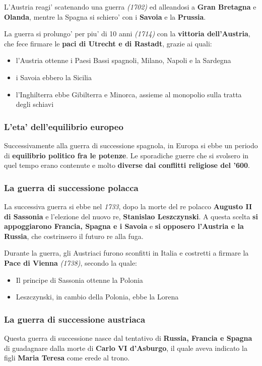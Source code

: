 \documentclass{article}
\begin{document}
{{    L'Austria reagi' scatenando una guerra \textit{(1702)} ed alleandosi a \textbf{Gran Bretagna} e \textbf{Olanda}, mentre la Spagna si schiero' con i \textbf{Savoia} e la \textbf{Prussia}.

    La guerra si prolungo' per piu' di 10 anni \textit{(1714)} con la \textbf{vittoria dell'Austria}, che fece firmare le \textbf{paci di Utrecht e di Rastadt}, grazie ai quali:

    \begin{itemize}
      \item l'Austria ottenne i Paesi Bassi spagnoli, Milano, Napoli e la Sardegna
      \item i Savoia ebbero la Sicilia
      \item l'Inghilterra ebbe Gibilterra e Minorca, assieme al monopolio sulla tratta degli schiavi
    \end{itemize}

    \subsubsection{L'eta' dell'equilibrio europeo}
    Successivamente alla guerra di successione spagnola, in Europa si ebbe un periodo di \textbf{equilibrio politico fra le potenze}. Le sporadiche guerre che si svolsero in quel tempo erano contenute e molto \textbf{diverse dai conflitti religiose del '600}.

    \subsubsection{La guerra di successione polacca}
    La successiva guerra si ebbe nel \textit{1733}, dopo la morte del re polacco \textbf{Augusto II di Sassonia} e l'elezione del nuovo re, \textbf{Stanislao Leszczynski}. A questa scelta \textbf{si appoggiarono Francia, Spagna e i Savoia} e \textbf{si opposero l'Austria e la Russia}, che costrinsero il futuro re alla fuga.

    Durante la guerra, gli Austriaci furono sconfitti in Italia e costretti a firmare la \textbf{Pace di Vienna} \textit{(1738)}, secondo la quale:

    \begin{itemize}
      \item Il principe di Sassonia ottenne la Polonia
      \item Leszczynski, in cambio della Polonia, ebbe la Lorena
    \end{itemize}

    \subsubsection{La guerra di successione austriaca}
    Questa guerra di successione nasce dal tentativo di \textbf{Russia, Francia e Spagna} di guadagnare dalla morte di \textbf{Carlo VI d'Asburgo}, il quale aveva indicato la figli \textbf{Maria Teresa} come erede al trono.

}}
\end{document}
